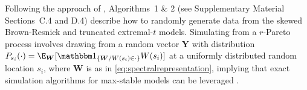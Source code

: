 \documentclass[12pt]{article}
\begin{document}
Following the approach of \citet{Dombry.Engelke.Oesting:2016},
Algorithms~1 \& 2 (see Supplementary Material Sections~C.4 and D.4) describe how to randomly generate data from the skewed Brown-Resnick and truncated extremal-$t$ models. 
%
Simulating from a $r$-Pareto process 
involves drawing from a random vector $\bm Y$ with distribution $P_{s_i}(\cdot) = \E_{\bm W}[\mathbbm 1_{\{\bm W/W(s_i)\in \cdot\}}W(s_i)]$ at a uniformly distributed random location $s_i$, where $\bm W$ is as in \eqref{eq:spectralrepresentation}, implying that
%
exact simulation algorithms for max-stable models can be leveraged \citep{Dombry.Engelke.Oesting:2016,Dombry.etal:2024}.  
%
\end{document}

